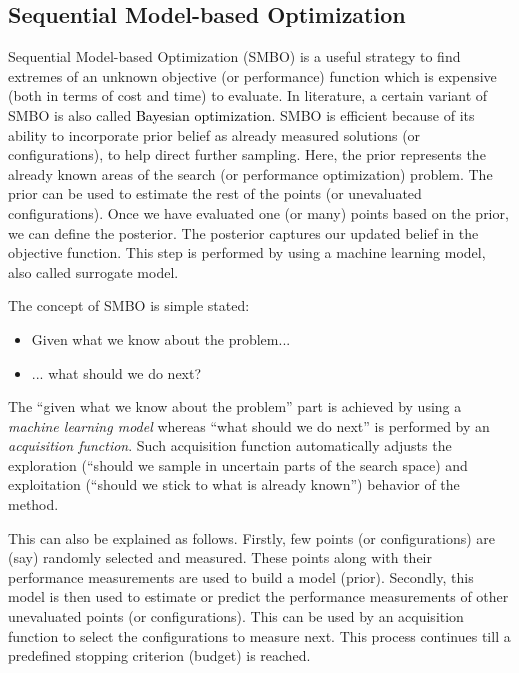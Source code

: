 \documentclass[10pt,journal,compsoc]{IEEEtran}
\newcommand{\bi}{\begin{itemize}}
\newcommand{\ei}{\end{itemize}}
\begin{document}
\subsection{Sequential Model-based Optimization}
Sequential Model-based Optimization (SMBO) is a useful strategy to find extremes
of an unknown objective (or performance) function which is expensive (both
in terms of cost and time) to evaluate. In literature, a certain variant of SMBO is also called \textcolor{black}{Bayesian optimization}. SMBO
is efficient because of its ability to incorporate prior belief as already measured solutions (or configurations),
to help direct further sampling. Here, the prior represents
the already known areas of the search (or performance
optimization) problem. The prior can be used to estimate the
rest of the points (or unevaluated configurations). Once we have evaluated one (or many) points based on the
prior, we can define the posterior. The posterior captures
our updated belief in the objective function. This step is
performed by using a machine learning model, also called surrogate model.


\noindent The concept of SMBO is simple stated:
\bi
\item
Given what we know about the problem...
\item
... what should we do next?
\ei
The ``given what we know about the problem'' part is achieved by using a \textit{machine learning model} whereas ``what should we do next'' is performed by an \textit{acquisition function}. Such acquisition function automatically adjusts the exploration (``should we sample in uncertain parts of the search space) and exploitation (``should we stick to what is already known'') behavior of the method. 

This can also be explained as follows. Firstly, few points (or configurations) are (say) randomly selected and measured. These points along with their performance measurements are used to build a model (prior). Secondly, this model is then used to estimate or predict the performance measurements of other unevaluated points (or configurations).%
This can be used by an acquisition function to select the configurations to measure next. This process continues till a predefined stopping criterion (budget) is reached.
\end{document}
